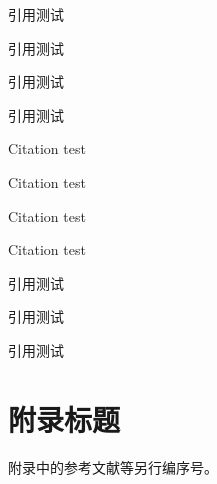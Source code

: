 \documentclass[degree=doctor]{thuthesis}
\begin{document}
\START
\showoutput

引用\cite{zhangkun1994}测试\par
引用\cite[42]{zhangkun1994}测试\par
引用\cite[见][]{zhukezhen1973}测试\par
引用\cite[见][42]{zhukezhen1973}测试\par

Citation \cite{dupont1974bone} test\par
Citation \cite[42]{dupont1974bone} test\par
Citation \cite[see][]{zhengkaiqing1987} test\par
Citation \cite[see][42]{zhengkaiqing1987} test\par

引用\cite{zhangkun1994}测试\par
引用\cite{zhukezhen1973,dupont1974bone}测试\par
引用\cite{zhengkaiqing1987,jiangxizhou1980,jianduju1994}测试\par

\nocite{*}

\printbibliography

\appendix
\chapter{附录标题}
附录中的参考文献等另行编序号\cite{zhukezhen1973,zhangkun1994}。
\printbibliography

\clearpage
\OMIT
\end{document}
